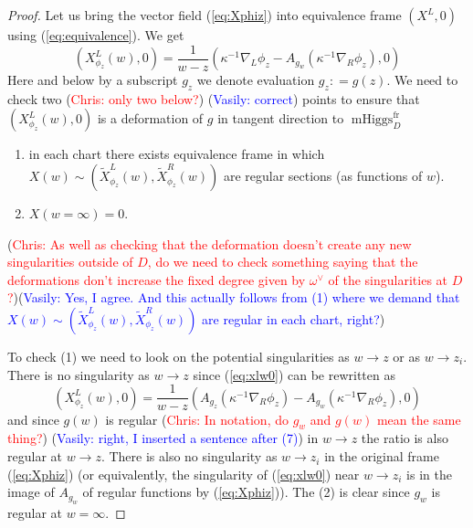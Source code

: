 \documentclass[11pt, oneside, reqno]{amsart}
\theoremstyle{definition} \newtheorem{definition}{Definition}[section]
\theoremstyle{definition} \newtheorem{remark}[definition]{Remark}
\theoremstyle{definition} \newtheorem{remarks}[definition]{Remarks}
\theoremstyle{definition} \newtheorem{question}[definition]{Question}
\theoremstyle{definition} \newtheorem*{note}{Note}
\theoremstyle{definition} \newtheorem{example}[definition]{Example}
\theoremstyle{definition} \newtheorem{examples}[definition]{Examples}
\DeclareMathOperator{\mhiggs}{mHiggs}
\newcommand{\fr}{\mathrm{fr}}
\newcommand{\chris}[1]{(\textcolor{red}{Chris: #1})}
\newcommand{\vasily}[1]{(\textcolor{blue}{Vasily: #1})}
\begin{document}
\begin{proof}
  Let us bring the vector field (\ref{eq:Xphiz}) into equivalence frame $(X^{L}, 0)$ using
  (\ref{eq:equivalence}). We get
  \begin{equation}
\label{eq:xlw0}
(X^L_{\phi_z} (w) , 0) =  \frac{1}{w - z} ( \kappa^{-1} \nabla_{L} \phi_z  - A_{g_{w}} (\kappa^{-1}\nabla_{R} \phi_{z}), 0 )
  \end{equation}
Here and below by a subscript $g_{z}$ we denote evaluation $g_{z}: = g(z)$. 
  We need to check two \chris{only two below?} \vasily{correct} points to ensure that $(X^L_{\phi_z} (w) , 0) $ is a deformation
  of $g$ in tangent direction to $\mhiggs^{\fr}_{D}$
  \begin{enumerate}
  \item in each chart there exists equivalence frame in which $X(w) \sim (\tilde X_{\phi_{z}}^{L}(w), \tilde X_{\phi_{z}}^{R}(w))$  are regular sections (as functions of $w$).
  \item $X(w = \infty) = 0$.
  \end{enumerate}
  \chris{As well as checking that the deformation doesn't create any new singularities outside of $D$, do we need to check something saying that the deformations don't increase the fixed degree given by $\omega^\vee$ of the singularities at $D$?}\vasily{Yes, I agree. And this actually follows from (1) where we demand
    that $X(w) \sim (\tilde X_{\phi_{z}}^{L}(w), \tilde X_{\phi_{z}}^{R}(w))$
  are regular in each chart, right?}


  To check (1) we need to look on the potential singularities as $w \to z$ or as $w \to z_i$.
  There is no singularity as $w \to z$ since (\ref{eq:xlw0}) can be rewritten
  as
  \begin{equation}
\label{eq:sklyanin-left}
(X^L_{\phi_z} (w) , 0)  =     \frac{1}{w - z} ( A_{g_z}( \kappa^{-1} \nabla_{R} \phi_z)  - A_{g_{w}} (\kappa^{-1}\nabla_{R} \phi_{z}),0)
  \end{equation}
  and since $g(w)$ is regular \chris{In notation, do $g_w$ and $g(w)$ mean the same thing?} \vasily{right, I inserted a sentence after (7)} in $w \to z$ the ratio is also regular at $w \to z$.
  There is also no singularity as $w \to z_i$ in the original frame (\ref{eq:Xphiz}) 
  (or equivalently, the singularity of (\ref{eq:xlw0}) near $w \to z_i$ 
  is in the image of $A_{g_{w}}$ of regular functions by (\ref{eq:Xphiz})).
 The (2) is clear since $g_{w}$ is regular at $w = \infty$. 
\end{proof}
\end{document}
